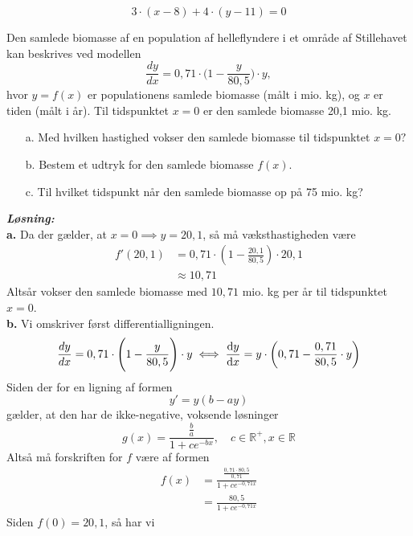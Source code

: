 \documentclass{article}
\newcommand{\sol}{\setlength{\parindent}{0cm}\textbf{\textit{Løsning:}}\setlength{\parindent}{1cm}}
\begin{document}
\[
3 \cdot \left(x-8\right) +4 \cdot \left(y-11\right) =0
\] 
\begin{question}{}{}
  Den samlede biomasse af en population af helleflyndere i et område af Stillehavet kan beskrives ved modellen
$$\dfrac{dy}{dx}=0,71\cdot\Bigg(1-\dfrac{y}{80,5}\Bigg)\cdot y,$$
hvor $y=f(x)$ er populationens samlede biomasse (målt i mio. kg),
og $x$ er tiden (målt i år).
Til tidspunktet $x=0$ er den samlede biomasse 20,1 mio. kg.
\begin{itemize}
  \item[a.] Med hvilken hastighed vokser den samlede biomasse til tidspunktet $x=0?$
  \item[b.] Bestem et udtryk for den samlede biomasse $f(x).$
  \item[c.] Til hvilket tidspunkt når den samlede biomasse op på 75 mio. kg?
\end{itemize}
\end{question}
\sol \\
\textbf{a.}
Da der gælder, at $x=0 \implies y=20,1$, så må væksthastigheden være
\begin{equation*}
\begin{split}
  f'(20,1)&= 0,71 \cdot \left(1-\frac{20,1}{80,5}\right) \cdot 20,1\\
  &\approx 10,71
\end{split}
\end{equation*}
Altsår vokser den samlede biomasse med $10,71$ mio. kg per år til tidspunktet $x=0$. \\[1ex]
\textbf{b.}
Vi omskriver først differentialligningen.
\begin{equation*}
\begin{split}
  \dfrac{dy}{dx}=0,71\cdot\Bigg(1-\dfrac{y}{80,5}\Bigg)\cdot y \iff \dv{y}{x}=y \cdot \left(0,71-\frac{0,71}{80,5} \cdot y\right) 
\end{split}
\end{equation*}
Siden der for en ligning af formen
\[
y'=y(b-ay)
\] 
gælder, at den har de ikke-negative, voksende løsninger 
\[
g(x)= \frac{\frac{b}{a}}{1+c e^{-bx} }, \quad c \in \mathbb{R}^+, x \in \mathbb{R}
\] 
Altså må forskriften for $f$ være af formen 
\begin{equation*}
\begin{split}
  f(x)&= \frac{\frac{0,71 \cdot 80,5}{0,71}}{1+ c e^{-0,71x}  }\\
  &=\frac{80,5}{1+c e^{-0,71x} }
\end{split}
\end{equation*}
Siden $f(0)= 20,1$, så har vi 
\end{document}
